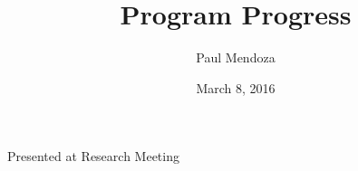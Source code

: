 \documentclass{beamer}
\title[Program Progress]{Program Progress}
\author{Paul Mendoza}
\date{March 8, 2016}
\begin{document}
\begin{frame}
    \titlepage
    \vspace{-1.8cm}
    \begin{center}
      Presented at Research Meeting
    \end{center}
\end{frame}





\end{document}
